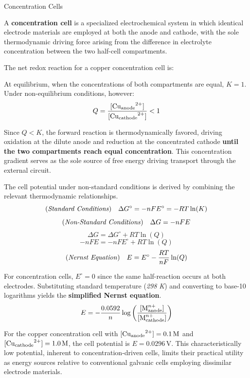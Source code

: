 \documentclass[10pt]{article}
\begin{document}
    \begin{core}{Concentration Cells}

      A \textbf{concentration cell} is a specialized electrochemical system in which identical electrode materials are employed at both the anode and cathode, with the sole thermodynamic driving force arising from the difference in electrolyte concentration between the two half-cell compartments.


      The net redox reaction for a copper concentration cell is:


      At equilibrium, when the concentrations of both compartments are equal, $K = 1$. Under non-equilibrium conditions, however:
      \[
        Q = \frac{[\ce{Cu_{\text{anode}}^{2+}}]}{[\ce{Cu_{\text{cathode}}^{2+}}]} < 1
      \]

      Since $Q < K$, the forward reaction is thermodynamically favored, driving oxidation at the dilute anode and reduction at the concentrated cathode \textbf{until the two compartments reach equal concentration}. This concentration gradient serves as the sole source of free energy driving  transport through the external circuit.

      The cell potential under non-standard conditions is derived by combining the relevant thermodynamic relationships.
      \[
        (\text{\textit{Standard Conditions}})\quad\Delta G^{\circ} = -nFE^{\circ} = -RT\ln(K)
      \]
      \[
        (\text{\textit{Non-Standard Conditions}})\quad\Delta G = -nFE
      \]
      \[
        \Delta G = \Delta G^{\circ} + RT\ln(Q)
      \]
      \[
        -nFE = -nFE^{\circ} + RT\ln(Q)
      \]
      \[
        (\text{\textit{Nernst Equation}})\quad E = E^{\circ} - \frac{RT}{nF}\ln(Q)
      \]

      For concentration cells, $E^{\circ} = 0$ since the same half-reaction occurs at both electrodes. Substituting standard temperature (\textit{298 K}) and converting to base-10 logarithms yields the \textbf{simplified Nernst equation}.
      \[
        E = -\frac{0.0592}{n}\log\left(\frac{[\ce{M^{n+}_{\text{anode}}}]}{[\ce{M^{n+}_{\text{cathode}}}]}\right)
      \]

      For the copper concentration cell with $[\ce{Cu_{\text{anode}}^{2+}}] = 0.1\,\text{M}$ and $[\ce{Cu_{\text{cathode}}^{2+}}] = 1.0\,\text{M}$, the cell potential is $E = 0.0296\,\text{V}$. This characteristically low potential, inherent to concentration-driven cells, limits their practical utility as energy sources relative to conventional galvanic cells employing dissimilar electrode materials.

    \end{core}
\end{document}
